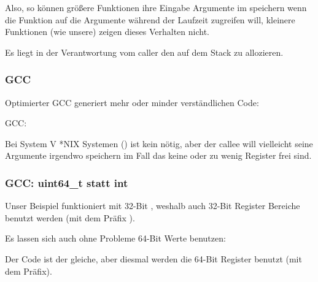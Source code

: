 Also, so können größere Funktionen ihre Eingabe Argumente im  speichern wenn die Funktion
auf die Argumente während der Laufzeit zugreifen will, kleinere Funktionen (wie unsere) zeigen dieses Verhalten 
nicht. 

Es liegt in der Verantwortung vom \gls{caller} den  auf dem Stack zu allozieren.

\subsubsection{GCC}

Optimierter GCC generiert mehr oder minder verständlichen Code:



\NonOptimizing GCC:




Bei System V *NIX Systemen (\SysVABI) ist kein  nötig, aber der \gls{callee} will vielleicht
seine Argumente irgendwo speichern im Fall das keine oder zu wenig Register frei sind.

\subsubsection{GCC: uint64\_t statt int}

Unser Beispiel funktioniert mit 32-Bit \Tint, weshalb auch 32-Bit Register Bereiche benutzt werden (mit dem Präfix ).

Es lassen sich auch ohne Probleme 64-Bit Werte benutzen:





Der Code ist der gleiche, aber diesmal werden die  64-Bit Register benutzt (mit dem  Präfix).

